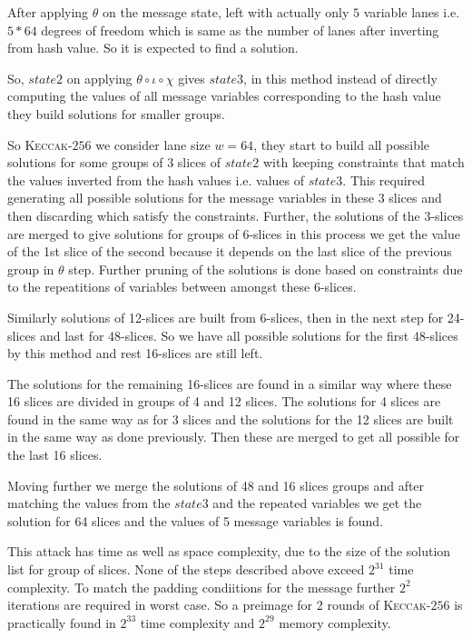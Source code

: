 \documentclass[runningheads]{llncs}
\newcommand{\KECCAK}{\mbox{\textsc{Keccak}}}
\begin{document}
After applying $\theta$ on the message state, left with actually only $5$ variable lanes i.e. $5*64$ degrees of freedom which is same as the number of lanes after inverting from hash value. So it is expected to find a solution.

So, $state2$ on applying $\theta \circ \iota \circ \chi$ gives $state3$, in this method instead of directly computing the values of all message variables corresponding to the hash value they build solutions for smaller groups. 

So \KECCAK-$256$ we consider lane size $w = 64$, they start to build all possible solutions for some groups of 3 slices of $state2$ with keeping constraints that match the values inverted from the hash values i.e. values of $state3$. This required generating all possible solutions for the message variables in these 3 slices and then discarding which satisfy the constraints.
Further, the solutions of the 3-slices are merged to give solutions for groups of 6-slices in this process we get the value of the 1st slice of the second because it depends on the last slice of the previous group in $\theta$ step. Further pruning of the solutions is done based on constraints due to the repeatitions of variables between amongst these 6-slices.

Similarly solutions of 12-slices are built from 6-slices, then in the next step for 24-slices and last for 48-slices. 
So we have all possible solutions for the first 48-slices by this method and rest 16-slices are still left.

The solutions for the remaining 16-slices are found in a similar way where these 16 slices are divided in groups of 4 and 12 slices. The solutions for 4 slices are found in the same way as for 3 slices and the solutions for the 12 slices are built in the same way as done previously. Then these are merged to get all possible for the last 16 slices.

Moving further we merge the solutions of 48 and 16 slices groups and after matching the values from the $state3$ and the repeated variables we get the solution for 64 slices and the values of 5 message variables is found. 

This attack has time as well as space complexity, due to the size of the solution list for group of slices. None of the steps described above exceed $2^{31}$ time complexity. To match the padding condiitions for the message further $2^2$ iterations are required in worst case. So a preimage for 2 rounds of \KECCAK-$256$ is practically found in $2^{33}$ time complexity and $2^{29}$ memory complexity.
\end{document}
